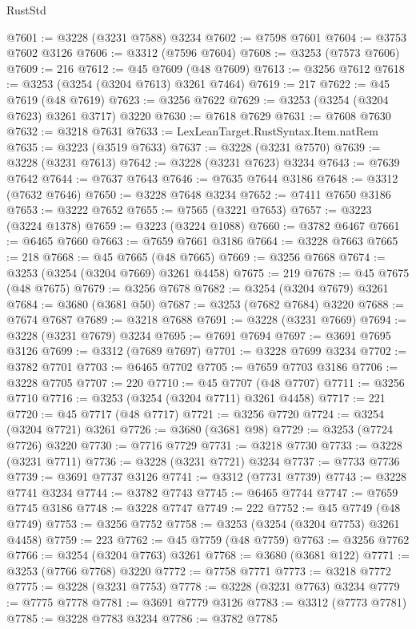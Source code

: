 \begin{lexlean}{RustStd}
\begin{coremodule}
{\begin{coremodule}
{{{{{{{{{{{{{{{{{{{{{{{{{{{{{{{{{{{{{@7601 := @3228 (@3231 @7588) @3234
@7602 := @7598 @7601
@7604 := @3753 @7602 @3126
@7606 := @3312 (@7596 @7604)
@7608 := @3253 (@7573 @7606)
@7609 := 216
@7612 := @45 @7609 (@48 @7609)
@7613 := @3256 @7612
@7618 := @3253 (@3254 (@3204 @7613) @3261 @7464)
@7619 := 217
@7622 := @45 @7619 (@48 @7619)
@7623 := @3256 @7622
@7629 := @3253 (@3254 (@3204 @7623) @3261 @3717) @3220
@7630 := @7618 @7629
@7631 := @7608 @7630
@7632 := @3218 @7631
@7633 := LexLeanTarget.RustSyntax.Item.natRem
@7635 := @3223 (@3519 @7633)
@7637 := @3228 (@3231 @7570)
@7639 := @3228 (@3231 @7613)
@7642 := @3228 (@3231 @7623) @3234
@7643 := @7639 @7642
@7644 := @7637 @7643
@7646 := @7635 @7644 @3186
@7648 := @3312 (@7632 @7646)
@7650 := @3228 @7648 @3234
@7652 := @7411 @7650 @3186
@7653 := @3222 @7652
@7655 := @7565 (@3221 @7653)
@7657 := @3223 (@3224 @1378)
@7659 := @3223 (@3224 @1088)
@7660 := @3782 @6467
@7661 := @6465 @7660
@7663 := @7659 @7661 @3186
@7664 := @3228 @7663
@7665 := 218
@7668 := @45 @7665 (@48 @7665)
@7669 := @3256 @7668
@7674 := @3253 (@3254 (@3204 @7669) @3261 @4458)
@7675 := 219
@7678 := @45 @7675 (@48 @7675)
@7679 := @3256 @7678
@7682 := @3254 (@3204 @7679) @3261
@7684 := @3680 (@3681 @50)
@7687 := @3253 (@7682 @7684) @3220
@7688 := @7674 @7687
@7689 := @3218 @7688
@7691 := @3228 (@3231 @7669)
@7694 := @3228 (@3231 @7679) @3234
@7695 := @7691 @7694
@7697 := @3691 @7695 @3126
@7699 := @3312 (@7689 @7697)
@7701 := @3228 @7699 @3234
@7702 := @3782 @7701
@7703 := @6465 @7702
@7705 := @7659 @7703 @3186
@7706 := @3228 @7705
@7707 := 220
@7710 := @45 @7707 (@48 @7707)
@7711 := @3256 @7710
@7716 := @3253 (@3254 (@3204 @7711) @3261 @4458)
@7717 := 221
@7720 := @45 @7717 (@48 @7717)
@7721 := @3256 @7720
@7724 := @3254 (@3204 @7721) @3261
@7726 := @3680 (@3681 @98)
@7729 := @3253 (@7724 @7726) @3220
@7730 := @7716 @7729
@7731 := @3218 @7730
@7733 := @3228 (@3231 @7711)
@7736 := @3228 (@3231 @7721) @3234
@7737 := @7733 @7736
@7739 := @3691 @7737 @3126
@7741 := @3312 (@7731 @7739)
@7743 := @3228 @7741 @3234
@7744 := @3782 @7743
@7745 := @6465 @7744
@7747 := @7659 @7745 @3186
@7748 := @3228 @7747
@7749 := 222
@7752 := @45 @7749 (@48 @7749)
@7753 := @3256 @7752
@7758 := @3253 (@3254 (@3204 @7753) @3261 @4458)
@7759 := 223
@7762 := @45 @7759 (@48 @7759)
@7763 := @3256 @7762
@7766 := @3254 (@3204 @7763) @3261
@7768 := @3680 (@3681 @122)
@7771 := @3253 (@7766 @7768) @3220
@7772 := @7758 @7771
@7773 := @3218 @7772
@7775 := @3228 (@3231 @7753)
@7778 := @3228 (@3231 @7763) @3234
@7779 := @7775 @7778
@7781 := @3691 @7779 @3126
@7783 := @3312 (@7773 @7781)
@7785 := @3228 @7783 @3234
@7786 := @3782 @7785
}}}}}}}}}}}}}}}}}}}}}}}}}}}}}}}}}}}}}
\end{coremodule}}
\end{coremodule}
\end{lexlean}
